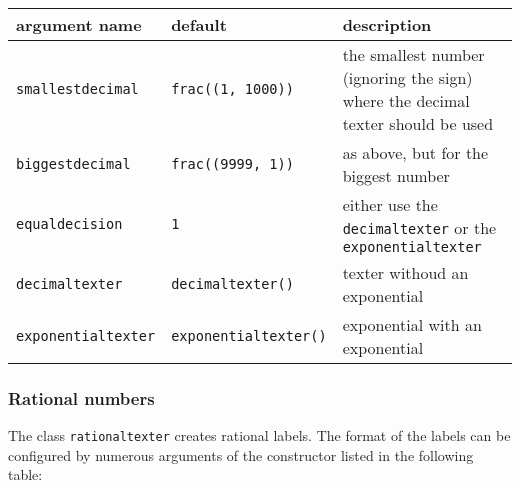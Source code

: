 \medskip
\begin{tabularx}{\linewidth}{ll>{\raggedright\arraybackslash}X}
argument name&default&description\\
\hline
\texttt{smallestdecimal}&\texttt{frac((1, 1000))}&the smallest number (ignoring the sign) where the decimal texter should be used\\
\texttt{biggestdecimal}&\texttt{frac((9999, 1))}&as above, but for the biggest number\\
\texttt{equaldecision}&\texttt{1}&either use the \texttt{decimaltexter} or the \texttt{exponentialtexter}\\
\texttt{decimaltexter}&\texttt{decimaltexter()}&texter withoud an exponential\\
\texttt{exponentialtexter}&\texttt{exponentialtexter()}&exponential with an exponential\\
\end{tabularx}
\medskip

\subsubsection{Rational numbers}

The class \verb|rationaltexter| creates rational labels. The format of
the labels can be configured by numerous arguments of the constructor
listed in the following table:

